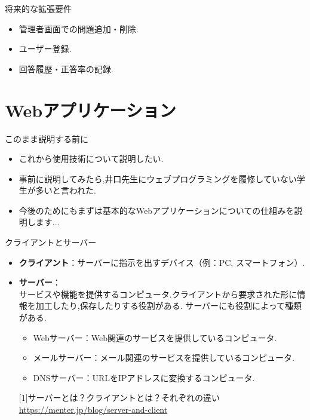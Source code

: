 \documentclass[aspectratio=169]{beamer}
\begin{document}
\begin{frame}{将来的な拡張要件}
    \begin{itemize}
        \setlength{\parskip}{1.5em}
        \item 管理者画面での問題追加・削除.
        \item ユーザー登録.
        \item 回答履歴・正答率の記録.
    \end{itemize}
\end{frame}

\section{Webアプリケーション}

\begin{frame}{このまま説明する前に}
    \begin{itemize}
        \setlength{\parskip}{1.5em}
        \item これから使用技術について説明したい.
        \item 事前に説明してみたら,井口先生にウェブプログラミングを履修していない学生が多いと言われた.
        \item 今後のためにもまずは基本的なWebアプリケーションについての仕組みを説明します...
    \end{itemize}
\end{frame}

\begin{frame}{クライアントとサーバー}
    \begin{itemize}
        \setlength{\parskip}{1.5em}
        \item \textbf{クライアント}：サーバーに指示を出すデバイス（例：PC, スマートフォン）\cite{server-client}.
        \item \textbf{サーバー}：\\サービスや機能を提供するコンピュータ.クライアントから要求された形に情報を加工したり,保存したりする役割がある.
                                サーバーにも役割によって種類がある.\\
        \vspace{1em}                                
        \begin{itemize}
            \setlength{\parskip}{1em}
            \item Webサーバー：Web関連のサービスを提供しているコンピュータ.
            \item メールサーバー：メール関連のサービスを提供しているコンピュータ.
            \item DNSサーバー：URLをIPアドレスに変換するコンピュータ.
        \end{itemize}                                
      {\tiny [1]サーバーとは？クライアントとは？それぞれの違い\url{https://menter.jp/blog/server-and-client}}  
        
    \end{itemize}
\end{frame}
\end{document}
